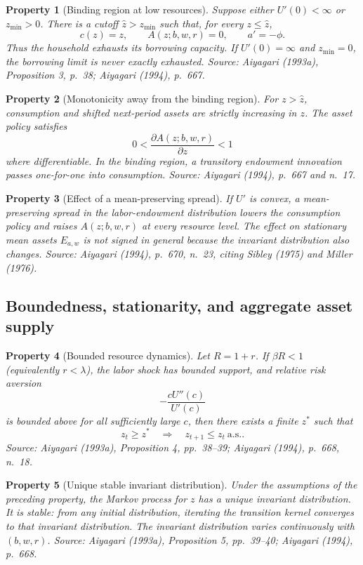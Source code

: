 \documentclass[11pt]{article}
\theoremstyle{propertystyle}
\newtheorem{property}{Property}
\newcommand{\1}{\mathbf{1}}
\newcommand{\as}{\text{a.s.}}
\begin{document}
\begin{property}[Binding region at low resources]
Suppose either $U'(0)<\infty$ or $z_{\min}>0$.  There is a cutoff
$\widehat z>z_{\min}$ such that, for every $z\leq\widehat z$,
\[
  c(z)=z,
  \qquad A(z;b,w,r)=0,
  \qquad a'=-\phi.
\]
Thus the household exhausts its borrowing capacity.  If $U'(0)=\infty$ and
$z_{\min}=0$, the borrowing limit is never exactly exhausted.
\emph{Source: Aiyagari (1993a), Proposition 3, p.~38; Aiyagari (1994),
p.~667.}
\end{property}

\begin{property}[Monotonicity away from the binding region]
For $z>\widehat z$, consumption and shifted next-period assets are strictly
increasing in $z$.  The asset policy satisfies
\[
  0<\frac{\partial A(z;b,w,r)}{\partial z}<1
\]
where differentiable.  In the binding region, a transitory endowment
innovation passes one-for-one into consumption.  \emph{Source: Aiyagari
(1994), p.~667 and n.~17.}
\end{property}

\begin{property}[Effect of a mean-preserving spread]
If $U'$ is convex, a mean-preserving spread in the labor-endowment distribution
lowers the consumption policy and raises $A(z;b,w,r)$ at every resource level.
The effect on stationary mean assets $E_{a,w}$ is not signed in general because
the invariant distribution also changes.  \emph{Source: Aiyagari (1994),
p.~670, n.~23, citing Sibley (1975) and Miller (1976).}
\end{property}

\subsection{Boundedness, stationarity, and aggregate asset supply}

\begin{property}[Bounded resource dynamics]
Let $R=1+r$.  If $\beta R<1$ (equivalently $r<\lambda$), the labor shock has
bounded support, and relative risk aversion
\[
  -\frac{cU''(c)}{U'(c)}
\]
is bounded above for all sufficiently large $c$, then there exists a finite
$z^*$ such that
\[
  z_t\geq z^* \quad\Longrightarrow\quad z_{t+1}\leq z_t\ \as.
\]
\emph{Source: Aiyagari (1993a), Proposition 4, pp.~38--39; Aiyagari
(1994), p.~668, n.~18.}
\end{property}

\begin{property}[Unique stable invariant distribution]
Under the assumptions of the preceding property, the Markov process for $z$
has a unique invariant distribution.  It is stable: from any initial
distribution, iterating the transition kernel converges to that invariant
distribution.  The invariant distribution varies continuously with
$(b,w,r)$.  \emph{Source: Aiyagari (1993a), Proposition 5, pp.~39--40;
Aiyagari (1994), p.~668.}
\end{property}
\end{document}
